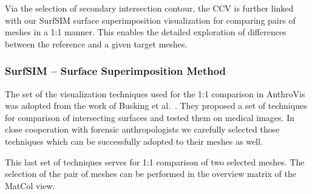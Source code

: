 \documentclass[final,5p,times]{elsarticle}
\begin{document}
Via the selection of secondary intersection contour, the CCV is further linked with our SurfSIM surface superimposition visualization for comparing pairs of meshes in a 1:1 manner. 
This enables the detailed exploration of differences between the reference and a given target meshes. 

\subsubsection{SurfSIM -- Surface Superimposition Method}
The set of the visualization techniques used for the 1:1 comparison in AnthroVis was adopted from the work of Busking et al.~\cite{busking2011image}.
They proposed a set of techniques for comparison of intersecting surfaces and tested them on medical images.
In close cooperation with forensic anthropologists we carefully selected those techniques which can be successfully adopted to their meshes as well.

This last set of techniques serves for 1:1 comparison of two selected meshes.
The selection of the pair of meshes can be performed in the overview matrix of the MatCol view.
\end{document}
